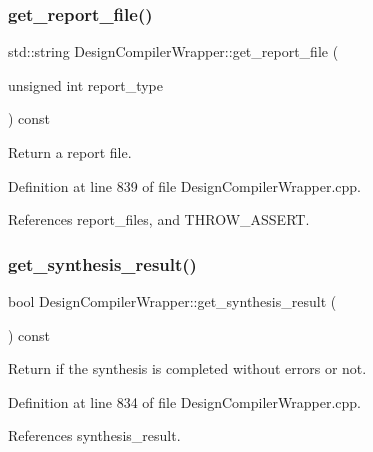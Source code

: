 \subsubsection{\texorpdfstring{get\+\_\+report\+\_\+file()}{get\_report\_file()}}
{\footnotesize\ttfamily std\+::string Design\+Compiler\+Wrapper\+::get\+\_\+report\+\_\+file (\begin{DoxyParamCaption}\item[{unsigned int}]{report\+\_\+type }\end{DoxyParamCaption}) const}



Return a report file. 



Definition at line 839 of file Design\+Compiler\+Wrapper.\+cpp.



References report\+\_\+files, and T\+H\+R\+O\+W\+\_\+\+A\+S\+S\+E\+RT.

\mbox{\label{classDesignCompilerWrapper_ab343423f9702cd1f35cae699ada77332}} 
\subsubsection{\texorpdfstring{get\+\_\+synthesis\+\_\+result()}{get\_synthesis\_result()}}
{\footnotesize\ttfamily bool Design\+Compiler\+Wrapper\+::get\+\_\+synthesis\+\_\+result (\begin{DoxyParamCaption}{ }\end{DoxyParamCaption}) const}



Return if the synthesis is completed without errors or not. 



Definition at line 834 of file Design\+Compiler\+Wrapper.\+cpp.



References synthesis\+\_\+result.

\mbox{\label{classDesignCompilerWrapper_ac547993a62653652618721e2b409228e}} 
